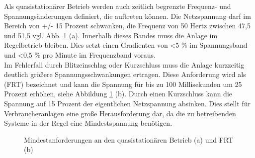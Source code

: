 Als quasistationärer Betrieb werden auch zeitlich begrenzte Frequenz- und Spannungsänderungen definiert, die auftreten können. Die Netzspannung darf im Bereich von +/- 15 Prozent schwanken, die Frequenz von 50 Hertz zwischen 47,5 und 51,5 vgl. Abb. \ref{fig:vde4120-Anforderungen} (a). Innerhalb dieses Bandes muss die Anlage im Regelbetrieb bleiben. Dies setzt einen Gradienten von <5 \% im Spannungsband und <0,5 \% pro Minute im Frequenzband voraus. \\
Im Fehlerfall durch Blitzeinschlag oder Kurzschluss muss die Anlage kurzzeitig deutlich größere Spannungsschwankungen ertragen. Diese Anforderung wird als  (\gls{FRT}) bezeichnet und kann die Spannung für bis zu 100 Millisekunden um 25 Prozent erhöhen, siehe Abbildung \ref{fig:vde4120-Anforderungen} (b). Durch einen Kurzschluss kann die Spannung auf 15 Prozent der eigentlichen Netzspannung absinken. Dies stellt für Verbraucheranlagen eine große Herausforderung dar, da die zu betreibenden Systeme in der Regel eine Mindestspannung benötigen.

\begin{figure}
\centering
{}%
\qquad
{}%
\caption{Mindestanforderungen an den quasistationären Betrieb (a) und \gls{FRT} (b) \cite{VDEARN4120}}
\label{fig:vde4120-Anforderungen}
\end{figure}




